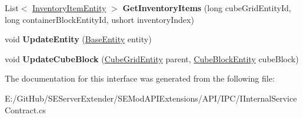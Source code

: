 \begin{DoxyCompactItemize}
\item 
\hypertarget{interface_s_e_mod_a_p_i_extensions_1_1_a_p_i_1_1_i_p_c_1_1_i_internal_service_contract_abc5b769f4aba976e24a61641505f4812}{}List$<$ \hyperlink{class_s_e_mod_a_p_i_internal_1_1_a_p_i_1_1_entity_1_1_inventory_item_entity}{Inventory\+Item\+Entity} $>$ {\bfseries Get\+Inventory\+Items} (long cube\+Grid\+Entity\+Id, long container\+Block\+Entity\+Id, ushort inventory\+Index)\label{interface_s_e_mod_a_p_i_extensions_1_1_a_p_i_1_1_i_p_c_1_1_i_internal_service_contract_abc5b769f4aba976e24a61641505f4812}

\item 
\hypertarget{interface_s_e_mod_a_p_i_extensions_1_1_a_p_i_1_1_i_p_c_1_1_i_internal_service_contract_a9759593218ebcd249d7374d101cb49bb}{}void {\bfseries Update\+Entity} (\hyperlink{class_s_e_mod_a_p_i_internal_1_1_a_p_i_1_1_entity_1_1_base_entity}{Base\+Entity} entity)\label{interface_s_e_mod_a_p_i_extensions_1_1_a_p_i_1_1_i_p_c_1_1_i_internal_service_contract_a9759593218ebcd249d7374d101cb49bb}

\item 
\hypertarget{interface_s_e_mod_a_p_i_extensions_1_1_a_p_i_1_1_i_p_c_1_1_i_internal_service_contract_a57eb1cb6ac3886bb24f6114d3e970209}{}void {\bfseries Update\+Cube\+Block} (\hyperlink{class_s_e_mod_a_p_i_internal_1_1_a_p_i_1_1_entity_1_1_sector_1_1_sector_object_1_1_cube_grid_entity}{Cube\+Grid\+Entity} parent, \hyperlink{class_s_e_mod_a_p_i_internal_1_1_a_p_i_1_1_entity_1_1_sector_1_1_sector_object_1_1_cube_grid_1_1_cube_block_entity}{Cube\+Block\+Entity} cube\+Block)\label{interface_s_e_mod_a_p_i_extensions_1_1_a_p_i_1_1_i_p_c_1_1_i_internal_service_contract_a57eb1cb6ac3886bb24f6114d3e970209}

\end{DoxyCompactItemize}


The documentation for this interface was generated from the following file\+:\begin{DoxyCompactItemize}
\item 
E\+:/\+Git\+Hub/\+S\+E\+Server\+Extender/\+S\+E\+Mod\+A\+P\+I\+Extensions/\+A\+P\+I/\+I\+P\+C/I\+Internal\+Service\+Contract.\+cs\end{DoxyCompactItemize}
